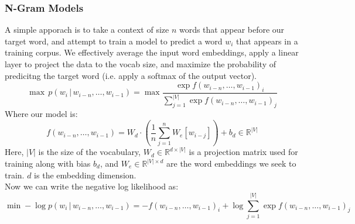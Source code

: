\subsubsection{N-Gram Models}
A simple apporach is to take a context of size $n$ words that appear before our
target word, and attempt to train a model to predict a word $w_i$ that appears
in a training corpus. We effectively average the input word embeddings, apply
a linear layer to project the data to the vocab size, and maximize the probability
of predicitng the target word (i.e. apply a softmax of the output vector).
\begin{equation}
  \max \, p(w_{i} \,|\, w_{i-n}, \dots, w_{i-1}) = \max \frac{\exp f(w_{i-n}, \dots, w_{i-1})_i}{\sum_{j=1}^{|V|}\exp f(w_{i-n}, \dots, w_{i-1})_j }
\end{equation}
Where our model is:
\begin{equation}
  f(w_{i-n}, \dots, w_{i-1}) = W_d \cdot \left( \frac{1}{n}\sum_{j=1}^n W_e[w_{i-j}] \right) + b_d \in \mathbb{R}^{|V|}
\end{equation}
Here, $|V|$ is the size of the vocabulary, $W_d\in\mathbb{R}^{d\times|V|}$ is
a projection matrix used for training along with bias $b_d$,
and $W_e\in\mathbb{R}^{|V|\times d}$ are the word embeddings we seek to train.
$d$ is the embedding dimension. \\
Now we can write the negative log likelihood as:
\begin{equation}
    \min -\log p(w_{i} \,|\, w_{i-n}, \dots, w_{i-1}) = - f(w_{i-n}, \dots, w_{i-1})_i + \log \sum_{j=1}^{|V|} \exp f(w_{i-n}, \dots, w_{i-1})_j
\end{equation}
